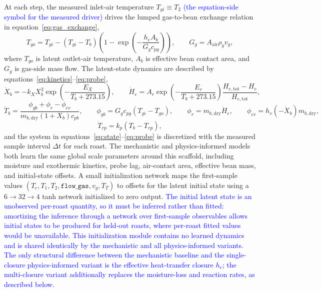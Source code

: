 \documentclass[fleqn,10pt]{wlscirep}
\newcommand{\rev}[1]{\textcolor{blue}{#1}}
\begin{document}
At each step, the measured inlet-air temperature $T_{gi} \equiv T_2$ \rev{(the equation-side symbol for the measured driver)} drives the lumped gas-to-bean exchange relation in equation~\eqref{eq:gas_exchange},
\begin{equation}\label{eq:gas_exchange}
T_{go}=T_{gi}-(T_{gi}-T_b)\left(1-\exp\left(-\frac{h_e A_b}{G_g c_{pg}}\right)\right),
\qquad
G_g=A_{\mathrm{air}}\rho_g v_g,
\end{equation}
where $T_{go}$ is latent outlet-air temperature, $A_b$ is effective bean contact area, and $G_g$ is gas-side mass flow. The latent-state dynamics are described by equations~\eqref{eq:kinetics}--\eqref{eq:probe},
\begin{equation}\label{eq:kinetics}
\dot{X}_b=-k_X X_b^2 \exp\!\left(-\frac{E_X}{T_b+273.15}\right),
\qquad
\dot{H}_e=A_r \exp\!\left(-\frac{E_r}{T_b+273.15}\right)\frac{H_{e,\mathrm{tot}}-H_e}{H_{e,\mathrm{tot}}},
\end{equation}
\begin{equation}\label{eq:temperature}
\dot{T}_b=\frac{\phi_{gb}+\phi_r-\phi_{ev}}{m_{b,\mathrm{dry}}(1+X_b)c_{pb}},
\qquad
\phi_{gb}=G_gc_{pg}(T_{gi}-T_{go}),
\qquad
\phi_r=m_{b,\mathrm{dry}}\dot{H}_e,
\qquad
\phi_{ev}=h_v(-\dot{X}_b)m_{b,\mathrm{dry}},
\end{equation}
\begin{equation}\label{eq:probe}
\dot{T}_{rp}=k_p(T_b-T_{rp}),
\end{equation}
and the system in equations~\eqref{eq:state}--\eqref{eq:probe} is discretized with the measured sample interval $\Delta t$ for each roast. The mechanistic and physics-informed models both learn the same global scale parameters around this scaffold, including moisture and exothermic kinetics, probe lag, air-contact area, effective bean mass, and initial-state offsets. A small initialization network maps the first-sample values $(T_c,T_1,T_2,\texttt{flow\_gas},v_g,T_T)$ to offsets for the latent initial state using a $6 \rightarrow 32 \rightarrow 4$ tanh network initialized to zero output. \rev{The initial latent state is an unobserved per-roast quantity, so it must be inferred rather than fitted: amortizing the inference through a network over first-sample observables allows initial states to be produced for held-out roasts, where per-roast fitted values would be unavailable. This initialization module contains no learned dynamics and is shared identically by the mechanistic and all physics-informed variants.} \rev{The only structural difference between the mechanistic baseline and the single-closure physics-informed variant is the effective heat-transfer closure $h_e$; the multi-closure variant additionally replaces the moisture-loss and reaction rates, as described below.}
\end{document}
